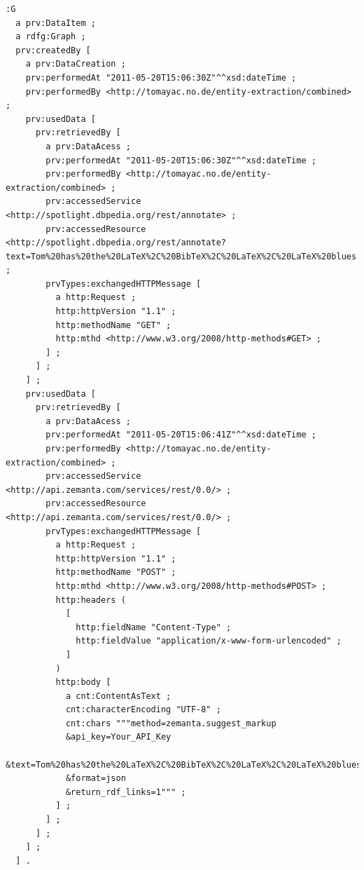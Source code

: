 \documentclass[twocolumn]{article}
\begin{document}
{\begin{lstlisting}
:G
  a prv:DataItem ;
  a rdfg:Graph ;
  prv:createdBy [
    a prv:DataCreation ;
    prv:performedAt "2011-05-20T15:06:30Z"^^xsd:dateTime ;
    prv:performedBy <http://tomayac.no.de/entity-extraction/combined> ;
    prv:usedData [
      prv:retrievedBy [
        a prv:DataAcess ;
        prv:performedAt "2011-05-20T15:06:30Z"^^xsd:dateTime ;
        prv:performedBy <http://tomayac.no.de/entity-extraction/combined> ;
        prv:accessedService <http://spotlight.dbpedia.org/rest/annotate> ;
        prv:accessedResource <http://spotlight.dbpedia.org/rest/annotate?text=Tom%20has%20the%20LaTeX%2C%20BibTeX%2C%20LaTeX%2C%20LaTeX%20blues...&confidence=0.4&support=20> ;
        prvTypes:exchangedHTTPMessage [
          a http:Request ;
          http:httpVersion "1.1" ;
          http:methodName "GET" ;
          http:mthd <http://www.w3.org/2008/http-methods#GET> ;
        ] ;
      ] ;
    ] ;
    prv:usedData [
      prv:retrievedBy [
        a prv:DataAcess ;
        prv:performedAt "2011-05-20T15:06:41Z"^^xsd:dateTime ;
        prv:performedBy <http://tomayac.no.de/entity-extraction/combined> ;
        prv:accessedService <http://api.zemanta.com/services/rest/0.0/> ;
        prv:accessedResource <http://api.zemanta.com/services/rest/0.0/> ;
        prvTypes:exchangedHTTPMessage [
          a http:Request ;
          http:httpVersion "1.1" ;
          http:methodName "POST" ;
          http:mthd <http://www.w3.org/2008/http-methods#POST> ;
          http:headers (
            [
              http:fieldName "Content-Type" ;
              http:fieldValue "application/x-www-form-urlencoded" ;
            ]   
          )
          http:body [
            a cnt:ContentAsText ;
            cnt:characterEncoding "UTF-8" ;
            cnt:chars """method=zemanta.suggest_markup
            &api_key=Your_API_Key
            &text=Tom%20has%20the%20LaTeX%2C%20BibTeX%2C%20LaTeX%2C%20LaTeX%20blues...
            &format=json
            &return_rdf_links=1""" ;
          ] ;
        ] ;
      ] ;
    ] ;
  ] .
\end{lstlisting}
\vspace{1.0em}
}
\end{document}

